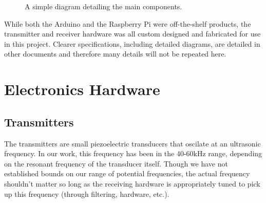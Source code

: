 \documentclass[12pt]{article}
\begin{document}
\begin{figure}[h]
\begin{center}
\end{center}
\caption{A simple diagram detailing the main components.}
\label{fig:component-diagram}
\end{figure}

While both the Arduino and the Raspberry Pi were off-the-shelf products,
the transmitter and receiver hardware was all custom designed and fabricated
for use in this project.
Clearer specifications, including detailed diagrams, are detailed in other
documents and therefore many details will not be repeated here.

\section{Electronics Hardware}\label{sec:ee-hardware}

\subsection{Transmitters}

The transmitters are small piezoelectric transducers that oscilate at an
ultrasonic frequency.
In our work, this frequency has been in the 40-60kHz range, depending on the
resonant frequency of the transducer itself.
Though we have not established bounds on our range of potential frequencies,
the actual frequency shouldn't matter so long as the receiving hardware is
appropriately tuned to pick up this frequency (through filtering, hardware,
etc.).
\end{document}
